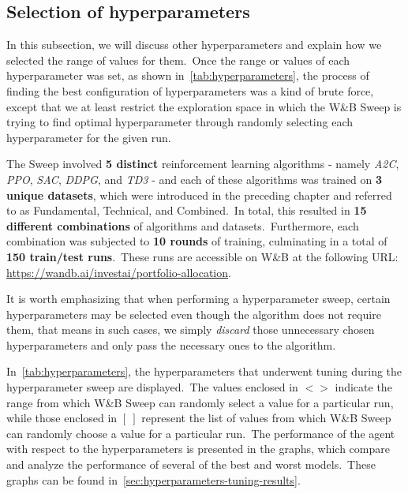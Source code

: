\documentclass[../xlapes02]{subfiles}
\begin{document}
    \subsection{Selection of hyperparameters}\label{subsec:selection_of_hyperparameters}
    In this subsection, we will discuss other hyperparameters and explain how we selected the range of values for them.\ Once the range or values of each hyperparameter was set, as shown in~\cref{tab:hyperparameters}, the process of finding the best configuration of hyperparameters was a kind of brute force, except that we at least restrict the exploration space in which the W\&B Sweep is trying to find optimal hyperparameter through randomly selecting each hyperparameter for the given run.

    The Sweep involved \textbf{5 distinct} reinforcement learning algorithms - namely \emph{A2C}, \emph{PPO}, \emph{SAC}, \emph{DDPG}, and \emph{TD3} - and each of these algorithms was trained on \textbf{3 unique datasets}, which were introduced in the preceding chapter and referred to as Fundamental, Technical, and Combined.\ In total, this resulted in \textbf{15 different combinations} of algorithms and datasets.\ Furthermore, each combination was subjected to \textbf{10 rounds} of training, culminating in a total of \textbf{150 train/test runs}.\ These runs are accessible on W\&B at the following URL: \url{https://wandb.ai/investai/portfolio-allocation}.

    It is worth emphasizing that when performing a hyperparameter sweep, certain hyperparameters may be selected even though the algorithm does not require them, that means in such cases, we simply \emph{discard} those unnecessary chosen hyperparameters and only pass the necessary ones to the algorithm.

    In~\cref{tab:hyperparameters}, the hyperparameters that underwent tuning during the hyperparameter sweep are displayed.\ The values enclosed in $<>$ indicate the range from which W\&B Sweep can randomly select a value for a particular run, while those enclosed in $[\ ]$ represent the list of values from which W\&B Sweep can randomly choose a value for a particular run.\ The performance of the agent with respect to the hyperparameters is presented in the graphs, which compare and analyze the performance of several of the best and worst models.\ These graphs can be found in~\cref{sec:hyperparameters-tuning-results}.
\end{document}
